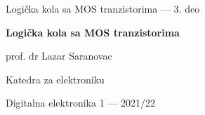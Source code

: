 \begin{frame}[label=09_3-s001]{Logička kola sa MOS tranzistorima — 3. deo}
\centering\vspace{6mm}
{\fontsize{23}{28}\selectfont\bfseries Logička kola sa MOS tranzistorima\par}
\vspace{9mm}
prof. dr Lazar Saranovac\par Katedra za elektroniku\par
Digitalna elektronika 1 — 2021/22
\end{frame}
